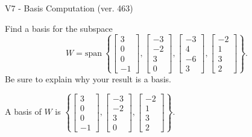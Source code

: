 \begin{exercise}
  \begin{exerciseTitle}V7 - Basis Computation (ver. 463)\end{exerciseTitle}
  \begin{exerciseStatement}
    Find a basis for the subspace 
\[W=\mathrm{span}\ \left\{\left[\begin{array}{r}
3 \\
0 \\
0 \\
-1
\end{array}\right] , \left[\begin{array}{r}
-3 \\
-2 \\
3 \\
0
\end{array}\right] , \left[\begin{array}{r}
-3 \\
4 \\
-6 \\
3
\end{array}\right] , \left[\begin{array}{r}
-2 \\
1 \\
3 \\
2
\end{array}\right]\right\}.\]
 Be sure to explain why your result is a basis.


  \end{exerciseStatement}
  \begin{exerciseAnswer}
   A basis of \(W\) is  \(\left\{\left[\begin{array}{r}
3 \\
0 \\
0 \\
-1
\end{array}\right] , \left[\begin{array}{r}
-3 \\
-2 \\
3 \\
0
\end{array}\right] , \left[\begin{array}{r}
-2 \\
1 \\
3 \\
2
\end{array}\right]\right\}\).
  


  \end{exerciseAnswer}
\end{exercise}